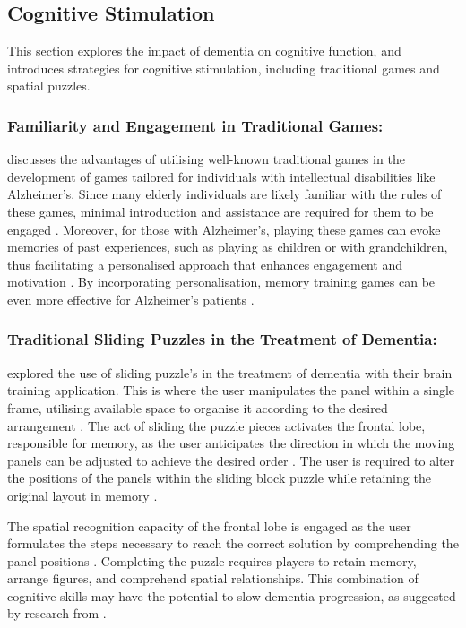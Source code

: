 \documentclass{l4proj}
\begin{document}
\subsection{Cognitive Stimulation}
This section explores the impact of dementia on cognitive function, and introduces strategies for cognitive stimulation, including traditional games and spatial puzzles.

\subsubsection{Familiarity and Engagement in Traditional Games:}\label{sec:traditional_games}
\cite{de_siqueira_review_2017} discusses the advantages of utilising well-known traditional games in the development of games tailored for individuals with intellectual disabilities like Alzheimer's. Since many elderly individuals are likely familiar with the rules of these games, minimal introduction and assistance are required for them to be engaged \citep{de_siqueira_review_2017}. Moreover, for those with Alzheimer's, playing these games can evoke memories of past experiences, such as playing as children or with grandchildren, thus facilitating a personalised approach that enhances engagement and motivation \citep{de_siqueira_review_2017}. By incorporating personalisation, memory training games can be even more effective for Alzheimer's patients \citep{eichhorn_innovative_2018}. \newline


\subsubsection{Traditional Sliding Puzzles in the Treatment of Dementia:}\label{sec:sliding_dementia}

\cite{sasaki_proposal_2020} explored the use of sliding puzzle's in the treatment of dementia with their brain training application. This is where the user manipulates the panel within a single frame, utilising available space to organise it according to the desired arrangement \citep{sasaki_proposal_2020}. The act of sliding the puzzle pieces activates the frontal lobe, responsible for memory, as the user anticipates the direction in which the moving panels can be adjusted to achieve the desired order \citep{hirono_procedural_1997}. The user is required to alter the positions of the panels within the sliding block puzzle while retaining the original layout in memory \citep{sasaki_proposal_2020}.

The spatial recognition capacity of the frontal lobe is engaged as the user formulates the steps necessary to reach the correct solution by comprehending the panel positions \citep{hirono_procedural_1997}. Completing the puzzle requires players to retain memory, arrange figures, and comprehend spatial relationships. This combination of cognitive skills may have the potential to slow dementia progression, as suggested by research from \cite{sasaki_proposal_2020}. \newline
\end{document}
